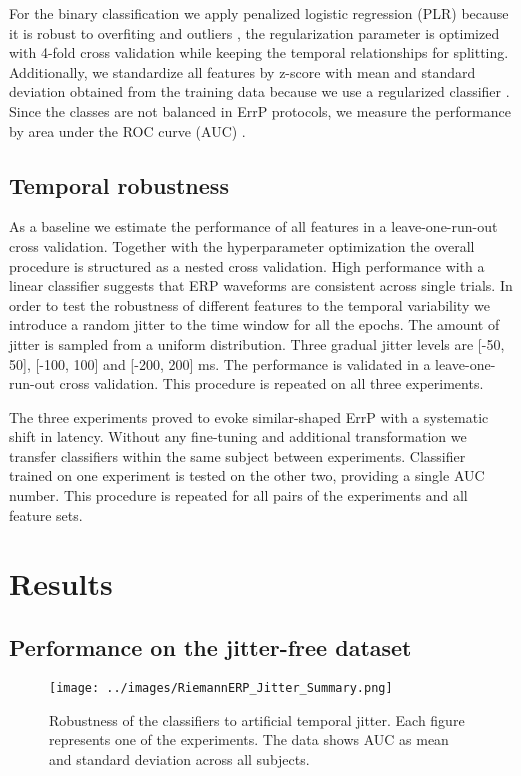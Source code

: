 \documentclass[12pt]{iopart}
\begin{document}
For the binary classification we apply penalized logistic
regression (PLR) because it is robust to overfiting and outliers \cite{parra_recipes_2005},
the regularization parameter is optimized with 4-fold cross validation
while keeping the temporal relationships for splitting. 
Additionally, we standardize all features by z-score with mean and standard deviation
obtained from the training data because we use a regularized classifier \cite{hastie_elements_2009}.
Since the classes
are not balanced in ErrP protocols, we measure the performance by area under the ROC curve (AUC) \cite{bradley_use_1997}.


\subsection{Temporal robustness}
As a baseline we estimate the performance of all features in a leave-one-run-out cross validation.
Together with the hyperparameter optimization the overall procedure is structured as
a nested cross validation.
High performance with a linear classifier suggests that ERP waveforms are consistent
across single trials. In order to test the robustness of different features
to the temporal variability we introduce a random jitter to the time window
for all the epochs. The amount of jitter is sampled from a uniform distribution.
Three gradual jitter levels are [-50, 50], [-100, 100] and [-200, 200] ms.
The performance is validated in a leave-one-run-out cross validation.
This procedure is repeated on all three experiments.

The three experiments proved to evoke similar-shaped ErrP with a 
systematic shift in latency. Without any fine-tuning and additional
transformation we transfer classifiers within the same subject
between experiments. Classifier trained on one experiment
is tested on the other two, providing a single AUC number.
This procedure is repeated for all pairs of the experiments and all feature sets.


\section{Results}
\label{sec:results}


\subsection{Performance on the jitter-free dataset}

\begin{figure}[!t]
    \texttt{[image: ../images/RiemannERP\_Jitter\_Summary.png]}
\caption{Robustness of the classifiers to artificial temporal jitter.
    Each figure represents one of the experiments. The data shows
    AUC as mean and standard deviation across all subjects.}
\label{fig:jitter}
\end{figure}
\end{document}
